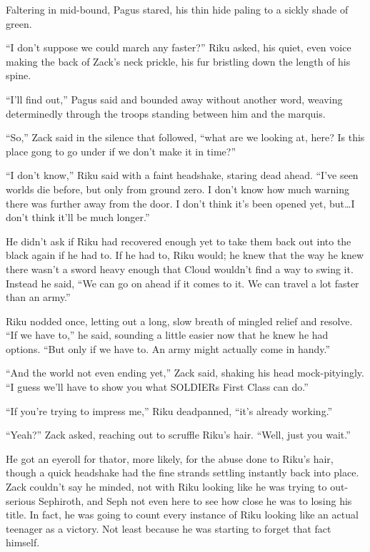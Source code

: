 Faltering in mid-bound, Pagus stared, his thin hide paling to a sickly shade of green.

``I don't suppose we could march any faster?'' Riku asked, his quiet, even voice making the back of Zack's neck prickle, his fur bristling down the length of his spine.

``I'll find out,'' Pagus said and bounded away without another word, weaving determinedly through the troops standing between him and the marquis.

``So,'' Zack said in the silence that followed, ``what are we looking at, here? Is this place gong to go under if we don't make it in time?''

``I don't know,'' Riku said with a faint headshake, staring dead ahead. ``I've seen worlds die before, but only from ground zero. I don't know how much warning there was further away from the door. I don't think it's been opened yet, but\ldots I don't think it'll be much longer.''

He didn't ask if Riku had recovered enough yet to take them back out into the black again if he had to. If he had to, Riku would; he knew that the way he knew there wasn't a sword heavy enough that Cloud wouldn't find a way to swing it. Instead he said, ``We can go on ahead if it comes to it. We can travel a lot faster than an army.''

Riku nodded once, letting out a long, slow breath of mingled relief and resolve. ``If we have to,'' he said, sounding a little easier now that he knew he had options. ``But only if we have to. An army might actually come in handy.''

``And the world not even ending yet,'' Zack said, shaking his head mock-pityingly. ``I guess we'll have to show you what SOLDIERs First Class can do.''

``If you're trying to impress me,'' Riku deadpanned, ``it's already working.''

``Yeah?'' Zack asked, reaching out to scruffle Riku's hair. ``Well, just you wait.''

He got an eyeroll for that\textemdash or, more likely, for the abuse done to Riku's hair, though a quick headshake had the fine strands settling instantly back into place. Zack couldn't say he minded, not with Riku looking like he was trying to out-serious Sephiroth, and Seph not even here to see how close he was to losing his title. In fact, he was going to count every instance of Riku looking like an actual teenager as a victory. Not least because he was starting to forget that fact himself.

